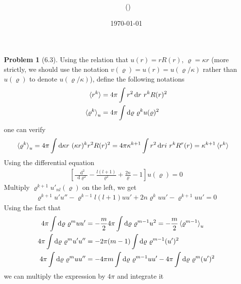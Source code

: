 \documentclass[twoside,11pt]{article}
\title{{\lms \Code \ \Ass}}
\author{\lms \name \ (\href{mailto:\mail}{\mail})}
\date{\sffamily \today}
\makeatletter
\renewcommand*\d{\mathop{}\!\mathrm{d}}
\theoremstyle{definition}
\newtheorem{problem}{Problem}
\theoremstyle{remark}
\newtheorem*{remark}{Remark}
\renewcommand{\maketitle}{\bgroup\setlength{\parindent}{0pt}
\begin{flushleft}
  \textbf{\Large\@title}

  \@author
\end{flushleft}\egroup
}
\makeatother
\begin{document}
\maketitle
\thispagestyle{title}


\begin{problem}[6.3]
Using the relation that $u(r) = rR(r)$, $\varrho=\kappa r$
(more strictly, we should use the notation $v(\varrho)=u(r)=u(\varrho/\kappa)$ rather than $u(\varrho)$
to denote $u(\varrho/\kappa)$),
define the following notations
\begin{align*}
    \braket{r^k} &= 4\pi \int r^2\d r\ r^k R(r)^2\\
    \braket{\varrho^k}_u &= 4\pi\int\d \varrho\ \varrho^k u(\varrho)^2
\end{align*}
one can verify
\begin{align*}
    \braket{\varrho^k}_u &= 4\pi\int\d \kappa r\ (\kappa r)^k r^2 R(r)^2
    =4\pi\kappa^{k+1} \int r^2\d ri\ r^kR^r(r) = \kappa^{k+1}\braket{r^k}
\end{align*}
Using the differential equation
\begin{align}
    \left[
        \frac{\d^2}{\d\varrho^2} - \frac{l(l+1)}{\varrho^2} + \frac{2n}{\varrho} - 1
    \right]u(\varrho) = 0
\end{align}
Multiply $\varrho^{k+1}u'_{nl}(\varrho)$ on the left, we get
\begin{align*}
    \varrho^{k+1}u'u'' - \varrho^{k-1}l(l+1)uu' + 2n\varrho^k uu' - \varrho^{k+1}uu' = 0
\end{align*}
Using the fact that
\begin{align*}
    4\pi\int\d\varrho\ \varrho^m uu' &= -\frac{m}{2}4\pi\int\d\varrho\ \varrho^{m-1}u^2
    = -\frac{m}{2}\braket{\varrho^{m-1}}_u\\
    4\pi\int\d\varrho\ \varrho^m u'u'' &= -2\pi(m-1)\int\d\varrho\ \varrho^{m-1} (u')^2\\
    4\pi\int\d\varrho\ \varrho^m uu'' &= -4\pi m\int\d\varrho\ \varrho^{m-1}uu' -4\pi\int\d\varrho\
    \varrho^m (u')^2
\end{align*}
we can multiply the expression by $4\pi$ and integrate it

\end{problem}
\end{document}
